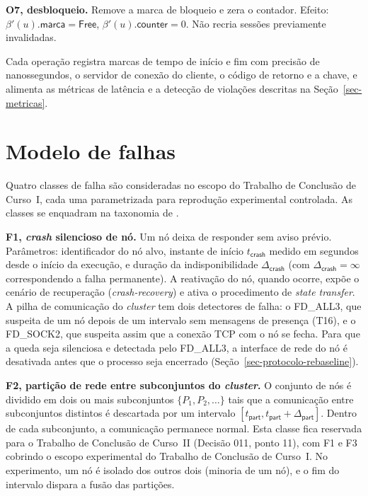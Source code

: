 \textbf{O7, desbloqueio.} Remove a marca de bloqueio e zera o contador. Efeito: $\beta'(u).\textsf{marca} = \textsf{Free}$, $\beta'(u).\textsf{counter} = 0$. Não recria sessões previamente invalidadas.

Cada operação registra marcas de tempo de início e fim com precisão de nanossegundos, o servidor de conexão do cliente, o código de retorno e a chave, e alimenta as métricas de latência e a detecção de violações descritas na Seção~\ref{sec-metricas}.

\section*{Modelo de falhas}
\label{sec-falhas}

Quatro classes de falha são consideradas no escopo do Trabalho de Conclusão de Curso~I, cada uma parametrizada para reprodução experimental controlada. As classes se enquadram na taxonomia de \citet{avizienis_taxonomy_2004}.

\textbf{F1, \emph{crash} silencioso de nó.} Um nó deixa de responder sem aviso prévio. Parâmetros: identificador do nó alvo, instante de início $t_\textsf{crash}$ medido em segundos desde o início da execução, e duração da indisponibilidade $\Delta_\textsf{crash}$ (com $\Delta_\textsf{crash} = \infty$ correspondendo a falha permanente). A reativação do nó, quando ocorre, expõe o cenário de recuperação (\emph{crash-recovery}) e ativa o procedimento de \emph{state transfer}. A pilha de comunicação do \emph{cluster} tem dois detectores de falha: o FD\_ALL3, que suspeita de um nó depois de um intervalo sem mensagens de presença (T16), e o FD\_SOCK2, que suspeita assim que a conexão TCP com o nó se fecha. Para que a queda seja silenciosa e detectada pelo FD\_ALL3, a interface de rede do nó é desativada antes que o processo seja encerrado (Seção~\ref{sec-protocolo-rebaseline}).

\textbf{F2, partição de rede entre subconjuntos do \emph{cluster}.} O conjunto de nós é dividido em dois ou mais subconjuntos $\{P_1, P_2, \ldots\}$ tais que a comunicação entre subconjuntos distintos é descartada por um intervalo $[t_\textsf{part}, t_\textsf{part} + \Delta_\textsf{part}]$. Dentro de cada subconjunto, a comunicação permanece normal. Esta classe fica reservada para o Trabalho de Conclusão de Curso~II (Decisão 011, ponto 11), com F1 e F3 cobrindo o escopo experimental do Trabalho de Conclusão de Curso~I. No experimento, um nó é isolado dos outros dois (minoria de um nó), e o fim do intervalo dispara a fusão das partições.


